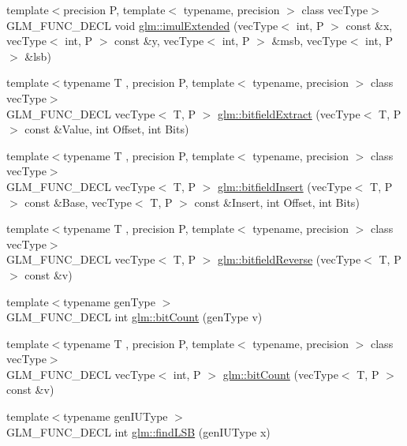 \begin{DoxyCompactItemize}
\item 
{\footnotesize template$<$precision P, template$<$ typename, precision $>$ class vec\+Type$>$ }\\G\+L\+M\+\_\+\+F\+U\+N\+C\+\_\+\+D\+E\+CL void \hyperlink{group__core__func__integer_ga6e6e8b29ca40d8ca2df10b58ed17d426}{glm\+::imul\+Extended} (vec\+Type$<$ int, P $>$ const \&x, vec\+Type$<$ int, P $>$ const \&y, vec\+Type$<$ int, P $>$ \&msb, vec\+Type$<$ int, P $>$ \&lsb)
\item 
{\footnotesize template$<$typename T , precision P, template$<$ typename, precision $>$ class vec\+Type$>$ }\\G\+L\+M\+\_\+\+F\+U\+N\+C\+\_\+\+D\+E\+CL vec\+Type$<$ T, P $>$ \hyperlink{group__core__func__integer_gab84b88f3a8e367774e5dd1c618c353cf}{glm\+::bitfield\+Extract} (vec\+Type$<$ T, P $>$ const \&Value, int Offset, int Bits)
\item 
{\footnotesize template$<$typename T , precision P, template$<$ typename, precision $>$ class vec\+Type$>$ }\\G\+L\+M\+\_\+\+F\+U\+N\+C\+\_\+\+D\+E\+CL vec\+Type$<$ T, P $>$ \hyperlink{group__core__func__integer_ga5681dfac9239beb1b8bd995e3c6496d7}{glm\+::bitfield\+Insert} (vec\+Type$<$ T, P $>$ const \&Base, vec\+Type$<$ T, P $>$ const \&Insert, int Offset, int Bits)
\item 
{\footnotesize template$<$typename T , precision P, template$<$ typename, precision $>$ class vec\+Type$>$ }\\G\+L\+M\+\_\+\+F\+U\+N\+C\+\_\+\+D\+E\+CL vec\+Type$<$ T, P $>$ \hyperlink{group__core__func__integer_ga153e7e8d0c035f83cce50fc3e580930f}{glm\+::bitfield\+Reverse} (vec\+Type$<$ T, P $>$ const \&v)
\item 
{\footnotesize template$<$typename gen\+Type $>$ }\\G\+L\+M\+\_\+\+F\+U\+N\+C\+\_\+\+D\+E\+CL int \hyperlink{group__core__func__integer_ga44abfe3379e11cbd29425a843420d0d6}{glm\+::bit\+Count} (gen\+Type v)
\item 
{\footnotesize template$<$typename T , precision P, template$<$ typename, precision $>$ class vec\+Type$>$ }\\G\+L\+M\+\_\+\+F\+U\+N\+C\+\_\+\+D\+E\+CL vec\+Type$<$ int, P $>$ \hyperlink{group__core__func__integer_ga1f29640969a3c54564da06ac67a5392e}{glm\+::bit\+Count} (vec\+Type$<$ T, P $>$ const \&v)
\item 
{\footnotesize template$<$typename gen\+I\+U\+Type $>$ }\\G\+L\+M\+\_\+\+F\+U\+N\+C\+\_\+\+D\+E\+CL int \hyperlink{group__core__func__integer_gaf74c4d969fa34ab8acb9d390f5ca5274}{glm\+::find\+L\+SB} (gen\+I\+U\+Type x)

\end{DoxyCompactItemize}
